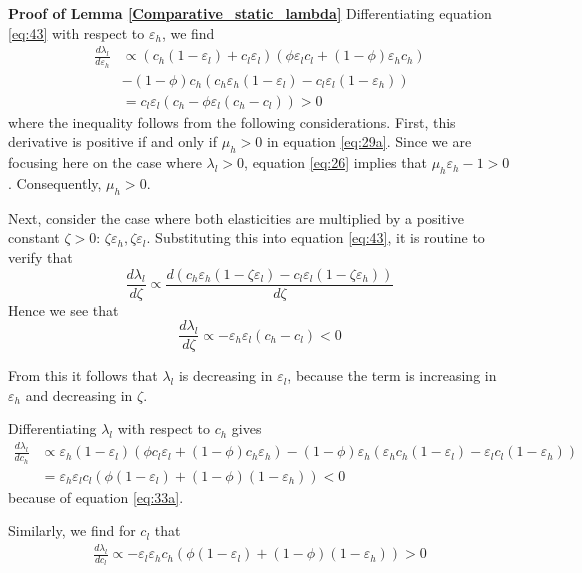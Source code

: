 \documentclass[a4paper,12pt]{article}
\begin{document}
\textbf{Proof of Lemma \ref{Comparative_static_lambda}}
Differentiating equation \eqref{eq:43} with respect to \(\varepsilon_h\), we find
\begin{align*}
\frac{d \lambda_l}{d \varepsilon_h} &\propto (c_h (1-\varepsilon_l)+c_l \varepsilon_l) (\phi \varepsilon_l c_l + (1-\phi) \varepsilon_hc_h)\\
  & - (1-\phi) c_h (c_h \varepsilon_h (1-\varepsilon_l) - c_l \varepsilon_l(1-\varepsilon_h)) \\
 &= c_l \varepsilon_l (c_h - \phi \varepsilon_l (c_h-c_l)) > 0
\end{align*}
where the inequality follows from the following considerations. First, this derivative is positive if and only if \(\mu_h >0\) in equation \eqref{eq:29a}. Since we are focusing here on the case where \(\lambda_l >0\), equation \eqref{eq:26} implies that \(\mu_h \varepsilon_h - 1>0\). Consequently, \(\mu_h >0\).

Next, consider the case where both elasticities are multiplied by a positive constant \(\zeta>0\): \(\zeta \varepsilon_{h} ,\zeta \varepsilon_{l}\). Substituting this into equation \eqref{eq:43}, it is routine to verify that
\begin{equation}
\label{eq:32}
\frac{d \lambda_l}{d \zeta} \propto \frac{d(c_h \varepsilon_h (1- \zeta \varepsilon_l )-c_l \varepsilon_l(1-\zeta \varepsilon_h))}{d \zeta}
\end{equation}
Hence we see that
\begin{equation}
\label{eq:35}
\frac{d \lambda_l}{d \zeta} \propto - \varepsilon_h \varepsilon_l (c_h-c_l) < 0
\end{equation}

From this it follows that \(\lambda_l\) is decreasing in \(\varepsilon_l\), because the term is increasing in \(\varepsilon_h\) and decreasing in \(\zeta\).

Differentiating \(\lambda_l\) with respect to \(c_h\) gives
\begin{align*}
\frac{d \lambda_l}{d c_h} &\propto \varepsilon_h (1-\varepsilon_l)(\phi c_l\varepsilon_l+(1-\phi)c_h \varepsilon_h) - (1-\phi) \varepsilon_h (\varepsilon_h c_h (1-\varepsilon_l) - \varepsilon_l c_l (1-\varepsilon_h)) \\
 &= \varepsilon_h \varepsilon_l c_l (\phi(1-\varepsilon_l)+(1-\phi)(1-\varepsilon_h)) <0
\end{align*}
because of equation \eqref{eq:33a}.

Similarly, we find for \(c_l\) that
\begin{align*}
\frac{d \lambda_l}{d c_l} \propto -\varepsilon_l \varepsilon_h c_h (\phi (1-\varepsilon_l) + (1-\phi) (1-\varepsilon_h)) >0
\end{align*}
\end{document}
